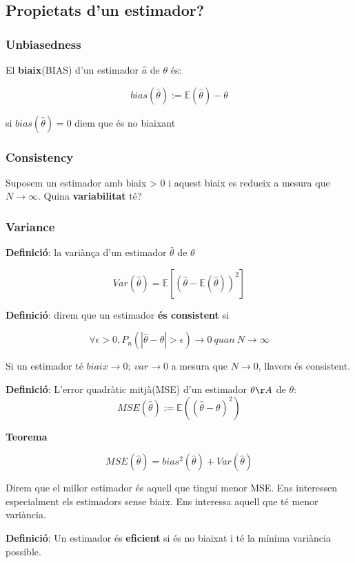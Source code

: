 \documentclass[a4paper]{article}
\begin{document}
\subsection{Propietats d'un estimador?}

\subsubsection{Unbiasedness}
	
	El \textbf{biaix}(BIAS) d'un estimador $\hat{a}$ de $\theta$ és:
	
	\[ bias(\hat{\theta}) := \mathbb{E}(\hat{\theta}) - \theta \]
	
	si $bias(\hat{\theta}) = 0$ diem que és no biaixant
	
\subsubsection{Consistency}
	Suposem un estimador amb biaix > 0 i aquest biaix es redueix a mesura que $N\rightarrow\infty$. Quina \textbf{variabilitat} té?

\subsubsection{Variance}
\textbf{Definició}: la variànça d'un estimador $\hat{\theta}$ de $\theta$

\[ Var(\hat{\theta}) = \mathbb{E}\left[(\hat{\theta} - \mathbb{E}(\hat{\theta}))^2\right] \]

\textbf{Definició}: direm que un estimador \textbf{és consistent} si

\[ \forall\epsilon>0, P_n(|\hat{\theta} - \theta| > \epsilon) \rightarrow 0\ quan\ N \rightarrow \infty \]

Si un estimador té $biaix \rightarrow 0;\ var\rightarrow0$ a mesura que $N\rightarrow0$, llavors és consistent.

\textbf{Definició}: L'error quadràtic mitjà(MSE) d'un estimador $\theta\AA$ de $\theta$:
\[MSE(\hat{\theta}) := \mathbb{E}\left((\hat{\theta}-\theta)^2\right)\]

\textbf{Teorema}

\[MSE(\hat{\theta}) = bias^2(\hat{\theta}) + Var(\hat{\theta})\]


Direm que el millor estimador és aquell que tingui menor MSE. Ens interessen especialment els estimadors sense biaix. Ens interessa aquell que té menor variància. 

\textbf{Definició}: Un estimador és \textbf{eficient} si és no biaixat i té la mínima variància possible.
\end{document}
